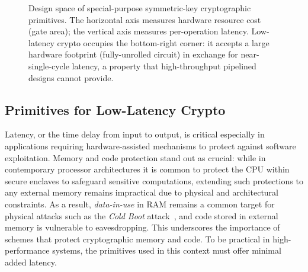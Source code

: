 \begin{figure}[htbp]
\caption{Design space of special-purpose symmetric-key cryptographic primitives.
  The horizontal axis measures hardware resource cost (gate area); the vertical axis
  measures per-operation latency.
  Low-latency crypto occupies the bottom-right corner: it accepts a large hardware
  footprint (fully-unrolled circuit) in exchange for near-single-cycle latency,
  a property that high-throughput pipelined designs cannot provide.}
\label{fig:design-space}
\end{figure}

\subsection{Primitives for Low-Latency Crypto}

Latency, or the time delay from input to output, is critical especially in applications requiring hardware-assisted mechanisms to protect against software exploitation.
Memory and code protection stand out as crucial: while in contemporary processor architectures it is common to protect the CPU within secure enclaves to safeguard sensitive computations, extending such protections to any external memory remains impractical due to physical and architectural constraints.
As a result, \emph{data-in-use} in RAM remains a common target for physical attacks such as the \emph{Cold Boot} attack~\cite{DBLP:conf/uss/HaldermanSHCPCFAF08}, and code stored in external memory is vulnerable to eavesdropping.
This underscores the importance of schemes that protect cryptographic memory and code.
To be practical in high-performance systems, the primitives used in this context must offer minimal added latency.

